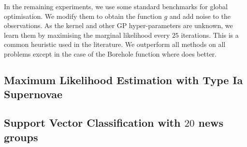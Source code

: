 In the remaining experiments, we use some standard benchmarks for global optimisation.
We modify them to obtain the function $g$ and add noise to the observations.
As the kernel and other GP hyper-parameters are unknown, we learn them by maximising
the marginal likelihood every $25$ iterations.
This is a common heuristic used in the \bayo{} literature.
We outperform all methods on all problems
except in the case of the Borehole function where \mfgpucbones does better.


\subsection{Maximum Likelihood Estimation with Type Ia Supernovae}
\label{sec:sn}

\subsection{Support Vector Classification with $20$ news groups}
\label{sec:sn}

\insertRealResultsFigure

